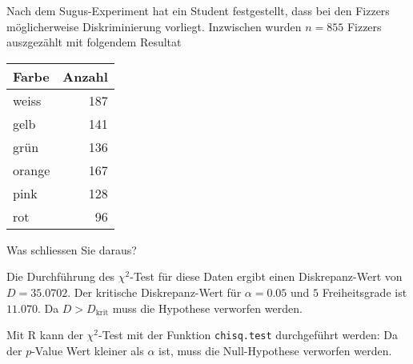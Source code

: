 Nach dem Sugus-Experiment hat ein Student festgestellt, dass bei den
Fizzers möglicherweise Diskriminierung vorliegt. Inzwischen wurden
$n=855$ Fizzers auszgezählt mit folgendem Resultat
\begin{center}
\begin{tabular}{|l|r|}
\hline
Farbe&Anzahl\\
\hline
weiss&187\\
gelb&141\\
grün&136\\
orange&167\\
pink&128\\
rot&96\\
\hline
\end{tabular}
\end{center}
Was schliessen Sie daraus?

\begin{loesung}
Die Durchführung des $\chi^2$-Test für diese Daten ergibt
einen Diskrepanz-Wert von $D=35.0702$. Der kritische Diskrepanz-Wert
für $\alpha = 0.05$ und $5$ Freiheitsgrade ist $11.070$. Da
$D>D_{\text{krit}}$ muss die Hypothese verworfen werden.

Mit R kann der $\chi^2$-Test mit der Funktion {\tt chisq.test} durchgeführt
werden:
Da der $p$-Value Wert kleiner als $\alpha$ ist, muss die
Null-Hypothese verworfen werden.
\end{loesung}
